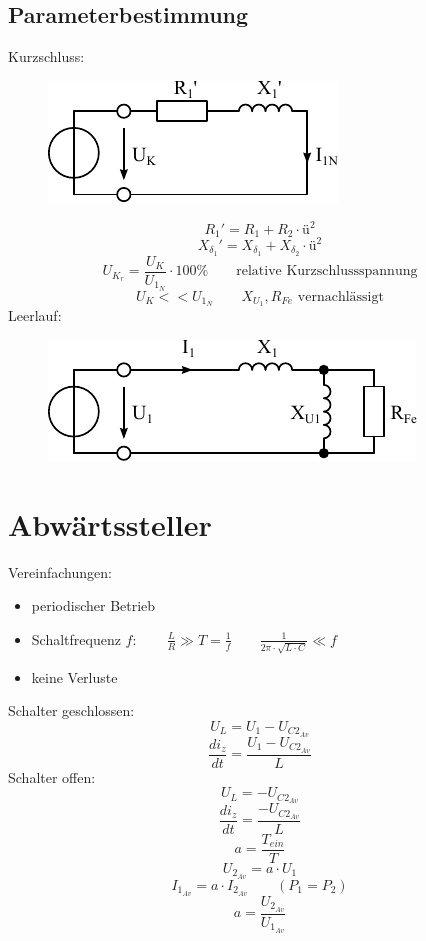 \subsection{Parameterbestimmung}
Kurzschluss: 
\begin{figure}[h!]
\centering
\includegraphics[scale=\schscale]{trafo-param-short.pdf}
\label{sch:trafo-param-short}
\end{figure}
\[ R_1' = R_1 + R_2 \cdot ü^2 \]
\[ X_{\delta_1}' = X_{\delta_1} + X_{\delta_2} \cdot ü^2 \]
\[ U_{K_r} = \frac{U_K}{U_{1_N}} \cdot 100 \% 
\qquad \text{relative Kurzschlussspannung} \]
\[ U_K << U_{1_N} \qquad X_{U_1}, R_{Fe} \text{ vernachlässigt} \]
Leerlauf: 
\begin{figure}[h!]
\centering
\includegraphics[scale=\schscale]{trafo-param-open.pdf}
\label{sch:trafo-param-open}
\end{figure}

\section{Abwärtssteller}
Vereinfachungen: 
\begin{itemize}
  \item periodischer Betrieb
  \item Schaltfrequenz $f: \qquad\frac{L}{R} \gg T = \frac{1}{f} 
        \qquad \frac{1}{2 \pi \cdot \sqrt{L \cdot C}} \ll f$
  \item keine Verluste
\end{itemize}
Schalter geschlossen: 
\[ U_L = U_1 - U_{C2_{Av}} \]
\[ \frac{d i_z}{d t} = \frac{U_1 - U_{C2_{Av}}}{L} \]
Schalter offen: 
\[ U_L = - U_{C2_{Av}} \]
\[ \frac{d i_z}{d t} = \frac{- U_{C2_{Av}}}{L} \]
\[ a = \frac{T_{ein}}{T} \]
\[ U_{2_{Av}} = a \cdot U_1 \]
\[ I_{1_{Av}} = a \cdot I_{2_{Av}} \qquad (P_1 = P_2) \]
\[ a = \frac{U_{2_{Av}}}{U_{1_{Av}}} \]

